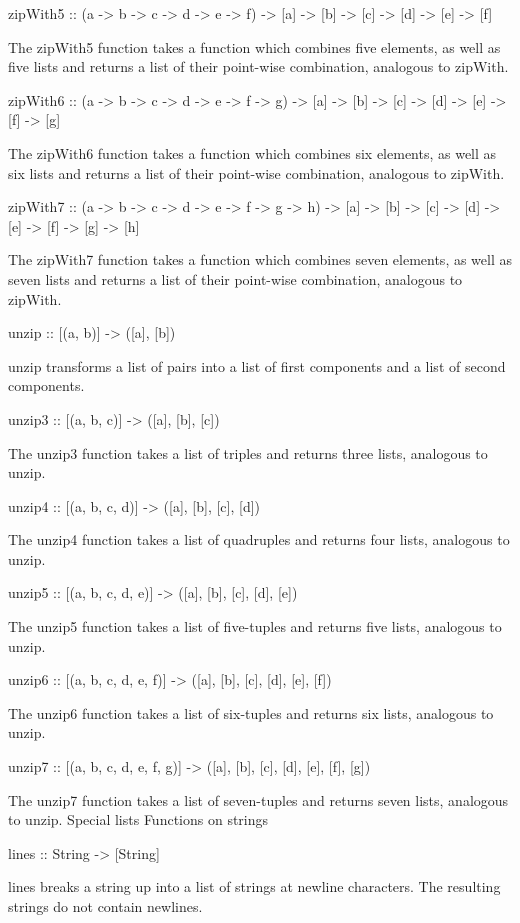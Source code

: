 zipWith5 :: (a -> b -> c -> d -> e -> f) -> [a] -> [b] -> [c] -> [d] -> [e] -> [f]

The zipWith5 function takes a function which combines five elements, as well as five lists and returns a list of their point-wise combination, analogous to zipWith.

zipWith6 :: (a -> b -> c -> d -> e -> f -> g) -> [a] -> [b] -> [c] -> [d] -> [e] -> [f] -> [g]

The zipWith6 function takes a function which combines six elements, as well as six lists and returns a list of their point-wise combination, analogous to zipWith.

zipWith7 :: (a -> b -> c -> d -> e -> f -> g -> h) -> [a] -> [b] -> [c] -> [d] -> [e] -> [f] -> [g] -> [h]

The zipWith7 function takes a function which combines seven elements, as well as seven lists and returns a list of their point-wise combination, analogous to zipWith.

unzip :: [(a, b)] -> ([a], [b])

unzip transforms a list of pairs into a list of first components and a list of second components.

unzip3 :: [(a, b, c)] -> ([a], [b], [c])

The unzip3 function takes a list of triples and returns three lists, analogous to unzip.

unzip4 :: [(a, b, c, d)] -> ([a], [b], [c], [d])

The unzip4 function takes a list of quadruples and returns four lists, analogous to unzip.

unzip5 :: [(a, b, c, d, e)] -> ([a], [b], [c], [d], [e])

The unzip5 function takes a list of five-tuples and returns five lists, analogous to unzip.

unzip6 :: [(a, b, c, d, e, f)] -> ([a], [b], [c], [d], [e], [f])

The unzip6 function takes a list of six-tuples and returns six lists, analogous to unzip.

unzip7 :: [(a, b, c, d, e, f, g)] -> ([a], [b], [c], [d], [e], [f], [g])

The unzip7 function takes a list of seven-tuples and returns seven lists, analogous to unzip.
Special lists
Functions on strings

lines :: String -> [String]

lines breaks a string up into a list of strings at newline characters. The resulting strings do not contain newlines.

